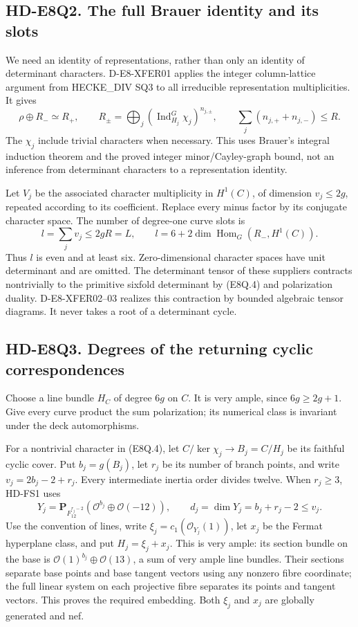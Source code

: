 \subsection*{HD-E8Q2. The full Brauer identity and its slots}

We need an identity of representations, rather than only an identity
of determinant characters. D-E8-XFER01 applies the integer
column-lattice argument from HECKE\_DIV SQ3 to all irreducible
representation multiplicities. It gives
\[
 \rho\oplus R_-\simeq R_+,\qquad
 R_\pm=\bigoplus_j
       (\operatorname{Ind}_{H_j}^G\chi_j)^{n_{j,\pm}},\qquad
 \sum_j(n_{j,+}+n_{j,-})\le R.                                 \tag{E8Q.4}
\]
The \(\chi_j\) include trivial characters when necessary. This
uses Brauer's integral induction theorem and the proved integer
minor/Cayley-graph bound, not an inference from determinant
characters to a representation identity.

Let \(V_j\) be the associated character multiplicity in \(H^1(C)\),
of dimension \(v_j\le2g\), repeated according to its coefficient.
Replace every minus factor by its conjugate character space.
The number of degree-one curve slots is
\[
 l=\sum_jv_j\le2gR=L,\qquad
 l=6+2\dim\operatorname{Hom}_G(R_-,H^1(C)).                     \tag{E8Q.5}
\]
Thus \(l\) is even and at least six. Zero-dimensional character
spaces have unit determinant and are omitted. The determinant
tensor of these suppliers contracts nontrivially to the primitive
sixfold determinant by (E8Q.4) and polarization duality.
D-E8-XFER02--03 realizes this contraction by bounded algebraic
tensor diagrams. It never takes a root of a determinant cycle.

\subsection*{HD-E8Q3. Degrees of the returning cyclic correspondences}

Choose a line bundle \(H_C\) of degree \(6g\) on \(C\).
It is very ample, since \(6g\ge2g+1\). Give every curve product
the sum polarization; its numerical class is invariant under
the deck automorphisms.

For a nontrivial character in (E8Q.4), let
\(C/\ker\chi_j\to B_j=C/H_j\) be its faithful cyclic cover.
Put \(b_j=g(B_j)\), let \(r_j\) be its number of branch points,
and write \(v_j=2b_j-2+r_j\). Every intermediate inertia order
divides twelve. When \(r_j\ge3\), HD-FS1 uses
\[
 Y_j=\mathbf P_{F_{12}^{r_j-2}}
       (\mathcal O^{b_j}\oplus\mathcal O(-12)),\qquad
 d_j=\dim Y_j=b_j+r_j-2\le v_j.                               \tag{E8Q.6}
\]
Use the convention of lines, write
\(\xi_j=c_1(\mathcal O_{Y_j}(1))\), let \(x_j\) be the
Fermat hyperplane class, and put \(H_j=\xi_j+x_j\).
This is very ample: its section bundle on the base is
\(\mathcal O(1)^{b_j}\oplus\mathcal O(13)\), a sum of
very ample line bundles. Their sections separate base points
and base tangent vectors using any nonzero fibre coordinate;
the full linear system on each projective fibre separates its
points and tangent vectors. This proves the required embedding.
Both \(\xi_j\) and \(x_j\) are globally generated and nef.

